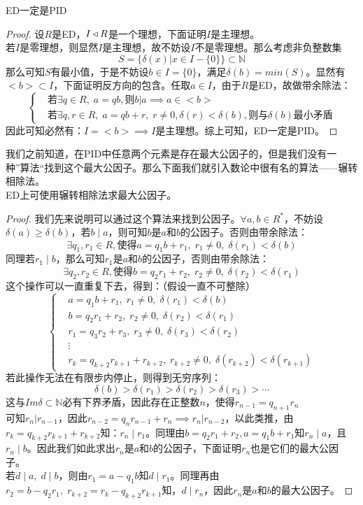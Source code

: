 ED一定是PID
\begin{proof}
设$R$是ED，$I\triangleleft R$是一个理想，下面证明$I$是主理想。\\
若$I$是零理想，则显然$I$是主理想，故不妨设$I$不是零理想。那么考虑非负整数集
\[
S=\{\delta(x)|x\in I-\{0\}\}\subset \mathbb{N}
\]
\indent 那么可知$S$有最小值，于是不妨设$b\in I=\{0\}$，满足$\delta(b)=min(S)$。显然有$<b>\subset I$，下面证明反方向的包含。任取$a\in I$，由于$R$是ED，故做带余除法：
\[
\left\{
\begin{aligned}
& \text{若}\exists q\in R,\; a=qb,\text{则}b|a\implies a\in <b>\\
& \text{若}\exists q,r\in R,\; a=qb+r,\; r\neq 0,\delta(r)<\delta(b),\text{则与}\delta(b)\text{最小矛盾}
\end{aligned}\right.
\]
因此可知必然有：$I=<b>\implies I$是主理想。综上可知，ED一定是PID。
\end{proof}
\indent 我们之前知道，在PID中任意两个元素是存在最大公因子的，但是我们没有一种”算法“找到这个最大公因子。那么下面我们就引入数论中很有名的算法——辗转相除法。\\
ED上可使用辗转相除法求最大公因子。
\begin{proof}
\indent 我们先来说明可以通过这个算法来找到公因子。$\forall a,b\in R^*$，不妨设$\delta(a)\geq \delta(b)$，若$b\mid a$，则可知$b$是$a$和$b$的公因子。否则由带余除法：
\[
\exists q_1,r_1\in R,\text{使得}a=q_1b+r_1,\; r_1\neq 0,\; \delta(r_1)<\delta(b)
\]
同理若$r_1\mid b$，那么可知$r_1$是$a$和$b$的公因子，否则由带余除法：
\[
\exists q_2,r_2\in R,\text{使得}b=q_2r_1+r_2,\; r_2\neq 0,\; \delta(r_2)<\delta(r_1)
\]
这个操作可以一直重复下去，得到：（假设一直不可整除）
\[
\left\{
\begin{aligned}
&a=q_1b+r_1,\; r_1\neq 0 ,\; \delta(r_1)<\delta(b)\\
&b=q_2r_1+r_2,\; r_2\neq 0,\; \delta(r_2)<\delta(r_1)\\
&r_1=q_3r_2+r_3,\; r_3\neq 0,\; \delta(r_3)<\delta(r_2)\\
&\vdots\\
&r_k=q_{k+2}r_{k+1}+r_{k+2},\; r_{k+2}\neq 0,\; \delta(r_{k+2})<\delta(r_{k+1})
\end{aligned}\right.
\]
若此操作无法在有限步内停止，则得到无穷序列：
\[
\delta(b)>\delta(r_1)>\delta(r_2)>\delta(r_3)>\cdots
\]
这与$Im\delta\subset\mathbb{N}$必有下界矛盾，因此存在正整数$n$，使得$r_{n-1}=q_{n+1}r_n$\\
\indent 可知$r_n|r_{n-1}$，因此$r_{n-2}=q_nr_{n-1}+r_n\implies r_n|r_{n-2}$，以此类推，由$r_k=q_{k+2}r_{k+1}+r_{k+2}$知：$r_n\mid r_1$。同理由$b=q_2r_1+r_2,a=q_1b+r_1$知$r_n\mid a$，且$r_n\mid b$。因此我们如此求出$r_n$是$a$和$b$的公因子，下面证明$r_n$也是它们的最大公因子。\\
\indent 若$d\mid a,\; d\mid b$，则由$r_1=a-q_1b$知$d\mid r_1$。同理再由$r_2=b-q_2r_1,\; r_{k+2}=r_k-q_{k+2}r_{k+1}$知，$d\mid r_n$，因此$r_n$是$a$和$b$的最大公因子。
\end{proof}


